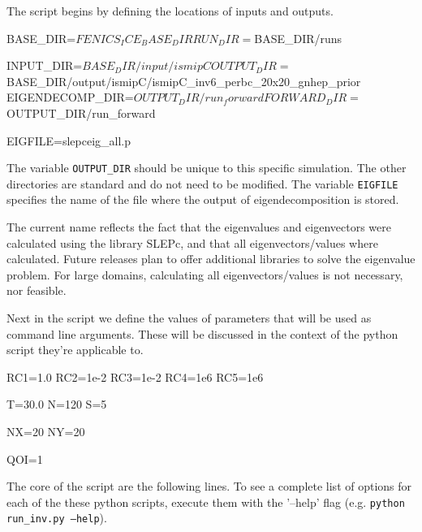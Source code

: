 \documentclass[11pt, reqno, nocenter]{article}
\begin{document}
The script begins by defining the locations of inputs and outputs.

\begin{spverbatim}
BASE_DIR=$FENICS_ICE_BASE_DIR
RUN_DIR=$BASE_DIR/runs

INPUT_DIR=$BASE_DIR/input/ismipC
OUTPUT_DIR=$BASE_DIR/output/ismipC/ismipC_inv6_perbc_20x20_gnhep_prior
EIGENDECOMP_DIR=$OUTPUT_DIR/run_forward
FORWARD_DIR=$OUTPUT_DIR/run_forward

EIGFILE=slepceig_all.p
\end{spverbatim}

The variable {\tt OUTPUT\_DIR} should be unique to this specific simulation. The other directories are standard and do not need to be modified. The variable {\tt EIGFILE} specifies the name of the file where the output of eigendecomposition is stored. 

The current name reflects the fact that the eigenvalues and eigenvectors were calculated using the library SLEPc, and that all eigenvectors/values where calculated. Future releases plan to offer additional libraries to solve the eigenvalue problem. For large domains, calculating all eigenvectors/values is not necessary, nor feasible. 

Next in the script we define the values of parameters that will be used as command line arguments. These will be discussed in the context of the python script they're applicable to.
\begin{spverbatim}
RC1=1.0
RC2=1e-2
RC3=1e-2
RC4=1e6
RC5=1e6

T=30.0
N=120
S=5

NX=20
NY=20

QOI=1
\end{spverbatim}

The core of the script are the following lines. To see a complete list of options for each of the these python scripts, execute them with the '--help' flag (e.g. {\tt python run\_inv.py --help}).


\end{document}
